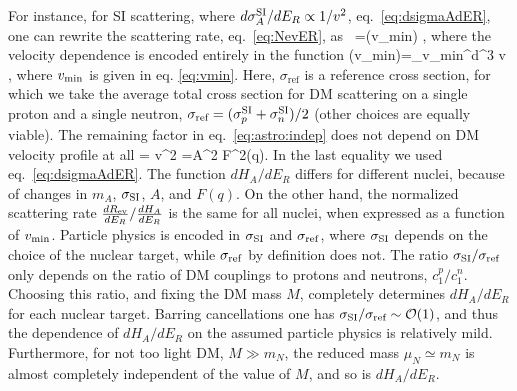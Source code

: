 For instance, for SI scattering, where $d\sigma_A^{\rm SI}/dE_R\propto 1/v^2$, 
eq.~\eqref{eq:dsigmaAdER}, one can rewrite the scattering rate, eq.~\eqref{eq:NevER}, as~\cite{Astro:out}
\beq\label{eq:astro:indep}
=\tilde  \eta(v_{\rm min})  ,
\eeq
where the velocity dependence is encoded entirely in the function
\beq
\tilde \eta(v_{\rm min})=\int_{v_{\rm min}}^\infty d^3 \vec v\, ,
\eeq
where $v_{\rm min}$ is given in eq. \eqref{eq:vmin}.
Here, $\sigma_\text{ref}$ is a reference cross section, for which we take the average total cross section for DM scattering on a single proton and a single neutron, $\sigma_\text{ref}=(\sigma_p^{\rm SI} +\sigma _n^{\rm SI})/2$ (other choices are equally viable). The remaining  factor in eq.~\eqref{eq:astro:indep} does not depend on DM velocity profile at all
\beq
{}=   v^2 =A^2 F^2(q).
\eeq
In the last equality we used eq.~\eqref{eq:dsigmaAdER}. The function $dH_A/dE_R$ differs for different nuclei, because of changes in $m_A$, $\sigma_{\rm SI}$, $A$, and $F(q)$.
On the other hand, the normalized scattering rate $\frac{d R_{\rm ev}}{dE_R}/\frac{dH_A}{dE_R}$ is the same for all nuclei, when expressed as a function of $v_{\rm min}$.
 Particle physics is encoded in $\sigma_{\rm SI}$ and $\sigma_{\rm ref}$, where $\sigma_{\rm SI}$ depends on the choice of the nuclear target, while $\sigma_{\rm ref}$ by definition does not. The ratio $\sigma_{\rm SI}/\sigma_\text{ref}$ only depends on the ratio of DM couplings to protons and neutrons, $c_1^p/c_1^n$. Choosing this ratio, and fixing the DM mass $M$, completely determines $dH_A/dE_R$ for each nuclear target.  Barring cancellations one has $ \sigma_{\rm SI}/\sigma_\text{ref}\sim {\mathcal O}(1)$, and thus the dependence of $dH_A/dE_R$ on the assumed particle physics is relatively mild. Furthermore, for not too light DM, $M\gg m_N$, the reduced mass $\mu_N\simeq m_N$ is almost completely independent of the value of $M$, and so is $dH_A/dE_R$.  

\smallskip

